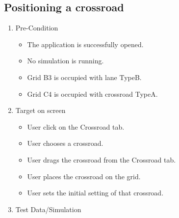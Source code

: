 \subsection{Positioning a crossroad}

\begin{enumerate}
	\item Pre-Condition
	\begin{itemize}
		\item The application is successfully opened.
		\item No simulation is running.
		\item Grid B3 is occupied with lane TypeB.
		\item Grid C4 is occupied with crossroad TypeA.
	\end{itemize}
	\item Target on screen
	\begin{itemize}
		\item User click on the Crossroad tab.
		\item User chooses a crossroad.
		\item User drags the crossroad from the Crossroad tab.
		\item User places the crossroad on the grid.
		\item User sets the initial setting of that crossroad.
	\end{itemize}
	\item Test Data/Simulation
\end{enumerate}	
